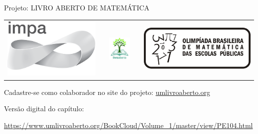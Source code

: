 \begin{center}
Projeto: LIVRO ABERTO DE MATEMÁTICA

\noindent \begin{tabular}{lcccr}
\includegraphics[scale=.15]{impa}& \quad\quad& \includegraphics[width=3cm]{logo} & \quad\quad& \includegraphics[scale=.24]{obmep} 
\end{tabular}
\end{center}

\vspace*{.3cm}

Cadastre-se como colaborador no site do projeto: \url{umlivroaberto.org}

Versão digital do capítulo:

\url{https://www.umlivroaberto.org/BookCloud/Volume_1/master/view/PE104.html}


